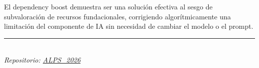 \documentclass[11pt, a4paper]{article}
\begin{document}
El dependency boost demuestra ser una solución efectiva al sesgo de subvaloración de recursos fundacionales, corrigiendo algorítmicamente una limitación del componente de IA sin necesidad de cambiar el modelo o el prompt.

\vspace{1cm}
\begin{center}
{\color{alpsgray}\rule{0.4\textwidth}{0.4pt}}\\[4pt]
{\small\itshape Repositorio: \href{https://github.com}{ALPS\_2026}}
\end{center}
\end{document}
